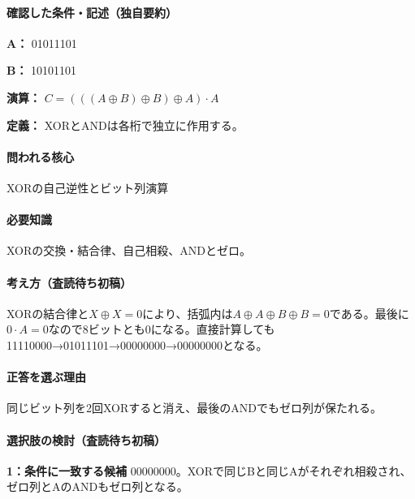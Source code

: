 \paragraph{確認した条件・記述（独自要約）}\mbox{}\par

\noindent\textbf{A：} 01011101\par

\noindent\textbf{B：} 10101101\par

\noindent\textbf{演算：} \(C=(((A\oplus B)\oplus B)\oplus A)\cdot A\)\par

\noindent\textbf{定義：} XORとANDは各桁で独立に作用する。\par

\paragraph{問われる核心} XORの自己逆性とビット列演算

\paragraph{必要知識} XORの交換・結合律、自己相殺、ANDとゼロ。

\paragraph{考え方（査読待ち初稿）} XORの結合律と\(X\oplus X=0\)により、括弧内は\(A\oplus A\oplus B\oplus B=0\)である。最後に\(0\cdot A=0\)なので8ビットとも0になる。直接計算しても11110000→01011101→00000000→00000000となる。

\paragraph{正答を選ぶ理由} 同じビット列を2回XORすると消え、最後のANDでもゼロ列が保たれる。

\paragraph{選択肢の検討（査読待ち初稿）}\mbox{}\par

\noindent\textbf{1：条件に一致する候補} 00000000。XORで同じBと同じAがそれぞれ相殺され、ゼロ列とAのANDもゼロ列となる。\par

